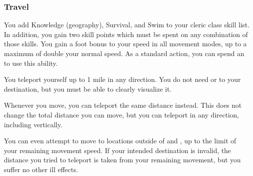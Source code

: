         \subsubsection{Travel}
             You add Knowledge (geography), Survival, and Swim to your cleric class skill list.
            In addition, you gain two skill points which must be spent on any combination of those skills.
             You gain a  foot bonus to your speed in all movement modes, up to a maximum of double your normal speed.
             As a standard action, you can spend an  to use this ability.
            \begin{ability}
                \begin{spelleffects}
                    \spelleffect You teleport yourself up to 1 mile in any direction.
                    You do not need  or  to your destination, but you must be able to clearly visualize it.
                \end{spelleffects}
            \end{ability}
             Whenever you move, you can teleport the same distance instead.
            This does not change the total distance you can move, but you can teleport in any direction, including vertically.

            You can even attempt to move to locations outside of  and , up to the limit of your remaining movement speed.
            If your intended destination is invalid, the distance you tried to teleport is taken from your remaining movement, but you suffer no other ill effects.


